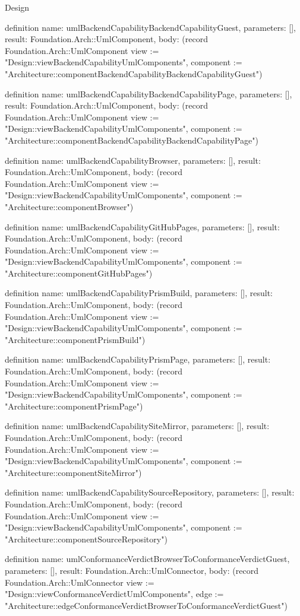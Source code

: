 \begin{lexlean}{Design}
\begin{semanticmodule}
definition{
  name: umlBackendCapabilityBackendCapabilityGuest,
  parameters: [],
  result: Foundation.Arch::UmlComponent,
  body: (record Foundation.Arch::UmlComponent {view := "Design::viewBackendCapabilityUmlComponents", component := "Architecture::componentBackendCapabilityBackendCapabilityGuest"})
}

definition{
  name: umlBackendCapabilityBackendCapabilityPage,
  parameters: [],
  result: Foundation.Arch::UmlComponent,
  body: (record Foundation.Arch::UmlComponent {view := "Design::viewBackendCapabilityUmlComponents", component := "Architecture::componentBackendCapabilityBackendCapabilityPage"})
}

definition{
  name: umlBackendCapabilityBrowser,
  parameters: [],
  result: Foundation.Arch::UmlComponent,
  body: (record Foundation.Arch::UmlComponent {view := "Design::viewBackendCapabilityUmlComponents", component := "Architecture::componentBrowser"})
}

definition{
  name: umlBackendCapabilityGitHubPages,
  parameters: [],
  result: Foundation.Arch::UmlComponent,
  body: (record Foundation.Arch::UmlComponent {view := "Design::viewBackendCapabilityUmlComponents", component := "Architecture::componentGitHubPages"})
}

definition{
  name: umlBackendCapabilityPrismBuild,
  parameters: [],
  result: Foundation.Arch::UmlComponent,
  body: (record Foundation.Arch::UmlComponent {view := "Design::viewBackendCapabilityUmlComponents", component := "Architecture::componentPrismBuild"})
}

definition{
  name: umlBackendCapabilityPrismPage,
  parameters: [],
  result: Foundation.Arch::UmlComponent,
  body: (record Foundation.Arch::UmlComponent {view := "Design::viewBackendCapabilityUmlComponents", component := "Architecture::componentPrismPage"})
}

definition{
  name: umlBackendCapabilitySiteMirror,
  parameters: [],
  result: Foundation.Arch::UmlComponent,
  body: (record Foundation.Arch::UmlComponent {view := "Design::viewBackendCapabilityUmlComponents", component := "Architecture::componentSiteMirror"})
}

definition{
  name: umlBackendCapabilitySourceRepository,
  parameters: [],
  result: Foundation.Arch::UmlComponent,
  body: (record Foundation.Arch::UmlComponent {view := "Design::viewBackendCapabilityUmlComponents", component := "Architecture::componentSourceRepository"})
}

definition{
  name: umlConformanceVerdictBrowserToConformanceVerdictGuest,
  parameters: [],
  result: Foundation.Arch::UmlConnector,
  body: (record Foundation.Arch::UmlConnector {view := "Design::viewConformanceVerdictUmlComponents", edge := "Architecture::edgeConformanceVerdictBrowserToConformanceVerdictGuest"})
}


\end{semanticmodule}
\end{lexlean}

